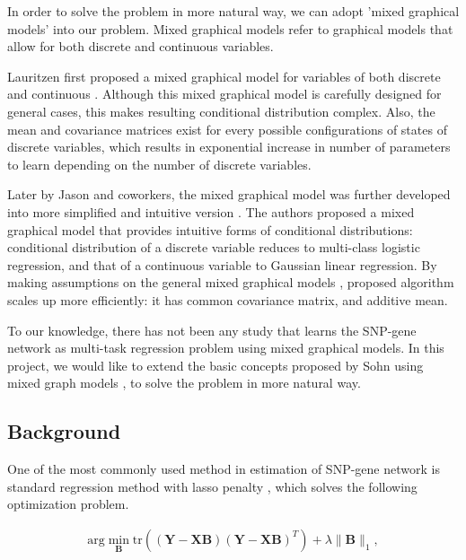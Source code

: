 \documentclass{article}
\begin{document}
In order to solve the problem in more natural way, we can adopt 'mixed graphical models' into our problem.
Mixed graphical models refer to graphical models that allow for both discrete and continuous variables.


Lauritzen first proposed a mixed graphical model for variables of both discrete and continuous \cite{lauritzen1989graphical}.
 Although this mixed graphical model is carefully designed for general cases, this makes resulting conditional distribution complex. Also, the mean and covariance matrices exist for every possible configurations of states of discrete variables, which results in exponential increase in number of parameters to learn depending on the number of discrete variables.




Later by Jason and coworkers, the mixed graphical model was further developed into more simplified and intuitive version \cite{lee2013structure}. 
The authors proposed a mixed graphical model that provides intuitive forms of conditional distributions: conditional distribution of a discrete variable reduces to multi-class logistic regression, and that of a continuous variable to Gaussian linear regression. 
By making assumptions on the general mixed graphical models  \cite{lauritzen1989graphical}, proposed algorithm scales up more efficiently: it has common covariance matrix, and additive mean.


To our knowledge, there has not been any study that learns the SNP-gene network as multi-task regression problem using mixed graphical models. 
In this project, we would like to extend the basic concepts proposed by Sohn  \cite{sohn2012joint} using mixed graph models \cite{lee2013structure}, to solve the problem in more natural way.







\subsection{Background}
One of the most commonly used method in estimation of SNP-gene network is standard regression method with lasso penalty \cite{tibshirani1996regression}, which solves the following optimization problem.

\begin{align}\label{eq:lasso}
\text{arg} \min_{\textbf{B}} \text{tr}((\mathbf{Y}-\mathbf{XB})(\mathbf{Y}-\mathbf{XB})^T) + \lambda \| \mathbf{B}\|_1,
\end{align}
\end{document}
